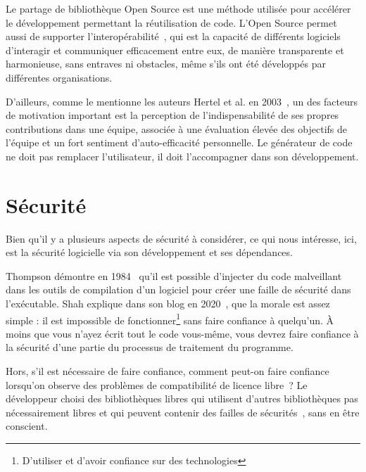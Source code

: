 Le partage de bibliothèque Open Source est une méthode utilisée pour accélérer le développement permettant la réutilisation de code. L’Open Source permet aussi de supporter l'interopérabilité~\cite{open_interop_2011}, qui est la capacité de différents logiciels d'interagir et communiquer efficacement entre eux, de manière transparente et harmonieuse, sans entraves ni obstacles, même s’ils ont été développés par différentes organisations.

D'ailleurs, comme le mentionne les auteurs Hertel et al. en 2003~\cite{HERTEL20031159}, un des facteurs de motivation important est la perception de l'indispensabilité de ses propres contributions dans une équipe, associée à une évaluation élevée des objectifs de l'équipe et un fort sentiment d'auto-efficacité personnelle. Le générateur de code ne doit pas remplacer l'utilisateur, il doit l'accompagner dans son développement.



\section{Sécurité}

Bien qu'il y a plusieurs aspects de sécurité à considérer, ce qui nous intéresse, ici, est la sécurité logicielle via son développement et ses dépendances.

Thompson démontre en 1984~\cite{thompson_trusting_1984} qu'il est possible d'injecter du code malveillant dans les outils de compilation d'un logiciel pour créer une faille de sécurité dans l'exécutable. Shah explique dans son blog en 2020~\cite{discussion_reflection_trusting_2020}, que la morale est assez simple : il est impossible de fonctionner\footnote{D'utiliser et d'avoir confiance sur des technologies} sans faire confiance à quelqu'un. À moins que vous n'ayez écrit tout le code vous-même, vous devrez faire confiance à la sécurité d'une partie du processus de traitement du programme.

Hors, s'il est nécessaire de faire confiance, comment peut-on faire confiance lorsqu'on observe des problèmes de compatibilité de licence libre~\cite{pfeiffer2022license}\cite{8667977}? Le développeur choisi des bibliothèques libres qui utilisent d'autres bibliothèques pas nécessairement libres et qui peuvent contenir des failles de sécurités~\cite{10.1145/3133956.3134048}, sans en être conscient. 

